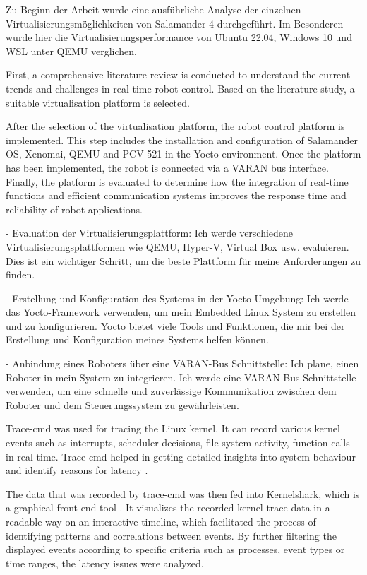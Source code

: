 \documentclass[MMR,Master,english]{twbook}
\begin{document}
Zu Beginn der Arbeit wurde eine ausführliche Analyse der einzelnen Virtualisierungsmöglichkeiten von Salamander 4 durchgeführt. Im Besonderen wurde hier die Virtualisierungsperformance von Ubuntu 22.04, Windows 10 und WSL unter QEMU verglichen.

First, a comprehensive literature review is conducted to understand the current trends and challenges in real-time robot control. Based on the literature study, a suitable virtualisation platform is selected. 


After the selection of the virtualisation platform, the robot control platform is implemented. This step includes the installation and configuration of Salamander OS, Xenomai, QEMU and PCV-521 in the Yocto environment. Once the platform has been implemented, the robot is connected via a VARAN bus interface. Finally, the platform is evaluated to determine how the integration of real-time functions and efficient communication systems improves the response time and reliability of robot applications.

- Evaluation der Virtualisierungsplattform: 
Ich werde verschiedene Virtualisierungsplattformen wie QEMU, Hyper-V, Virtual Box usw. evaluieren. Dies ist ein wichtiger Schritt, um die beste Plattform für meine Anforderungen zu finden.
  
- Erstellung und Konfiguration des Systems in der Yocto-Umgebung: 
Ich werde das Yocto-Framework verwenden, um mein Embedded Linux System zu erstellen und zu konfigurieren. Yocto bietet viele Tools und Funktionen, die mir bei der Erstellung und Konfiguration meines Systems helfen können.


- Anbindung eines Roboters über eine VARAN-Bus Schnittstelle:
Ich plane, einen Roboter in mein System zu integrieren. Ich werde eine VARAN-Bus Schnittstelle verwenden, um eine schnelle und zuverlässige Kommunikation zwischen dem Roboter und dem Steuerungssystem zu gewährleisten.

\bigskip \noindent Trace-cmd was used for tracing the Linux kernel. It can record various kernel events such as interrupts, scheduler decisions, file system activity, function calls in real time. Trace-cmd helped in getting detailed insights into system behaviour and identify reasons for latency \cite{Tracecmd}. 

\bigskip \noindent The data that was recorded by trace-cmd was then fed into Kernelshark, which is a graphical front-end tool \cite{KernelShark}. It visualizes the recorded kernel trace data in a readable way on an interactive timeline, which facilitated the process of identifying patterns and correlations between events. By further filtering the displayed events according to specific criteria such as processes, event types or time ranges, the latency issues were analyzed. 
\end{document}
